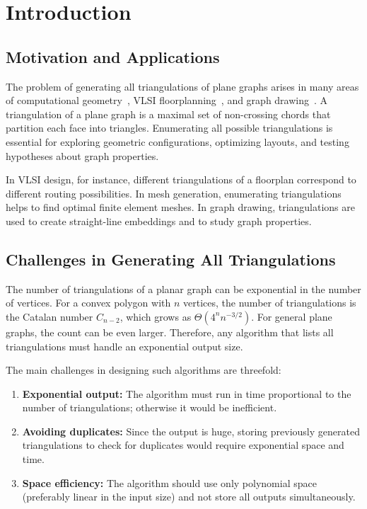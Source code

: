 
\chapter{Introduction}
\label{ch:introduction}

\section{Motivation and Applications}
\label{sec:motivation}

The problem of generating all triangulations of plane graphs arises in many areas of computational geometry~\cite{berg2008}, VLSI floorplanning~\cite{kozminski1985}, and graph drawing~\cite{nishizeki2004}. 
A triangulation of a plane graph is a maximal set of non-crossing chords that partition each face into triangles. 
Enumerating all possible triangulations is essential for exploring geometric configurations, optimizing layouts, and testing hypotheses about graph properties.

In VLSI design, for instance, different triangulations of a floorplan correspond to different routing possibilities. 
In mesh generation, enumerating triangulations helps to find optimal finite element meshes. 
In graph drawing, triangulations are used to create straight-line embeddings and to study graph properties.

\section{Challenges in Generating All Triangulations}
\label{sec:challenges}

The number of triangulations of a planar graph can be exponential in the number of vertices. 
For a convex polygon with \(n\) vertices, the number of triangulations is the Catalan number \(C_{n-2}\), which grows as \(\Theta(4^n n^{-3/2})\). 
For general plane graphs, the count can be even larger. 
Therefore, any algorithm that lists all triangulations must handle an exponential output size.

The main challenges in designing such algorithms are threefold:
\begin{enumerate}
    \item \textbf{Exponential output:} The algorithm must run in time proportional to the number of triangulations; otherwise it would be inefficient.
    \item \textbf{Avoiding duplicates:} Since the output is huge, storing previously generated triangulations to check for duplicates would require exponential space and time.
    \item \textbf{Space efficiency:} The algorithm should use only polynomial space (preferably linear in the input size) and not store all outputs simultaneously.
\end{enumerate}


